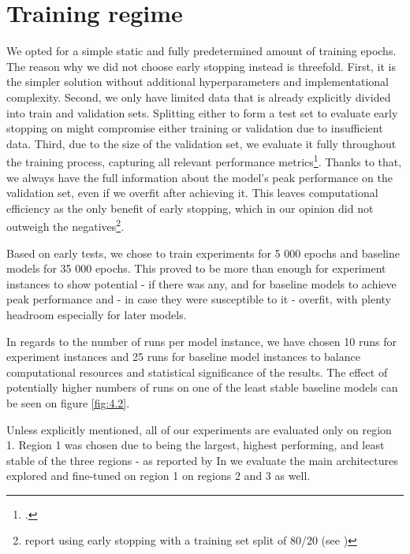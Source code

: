 \section{Training regime}\label{ch:4.4}

We opted for a simple static and fully predetermined amount of training epochs. The reason why we did not choose early stopping instead is threefold. First, it is the simpler solution without additional hyperparameters and implementational complexity. Second, we only have limited data that is already explicitly divided into train and validation sets. Splitting either to form a test set to evaluate early stopping on might compromise either training or validation due to insufficient data. Third, due to the size of the validation set, we evaluate it fully throughout the training process, capturing all relevant performance metrics\footnote{.}. Thanks to that, we always have the full information about the model’s peak performance on the validation set, even if we overfit after achieving it. This leaves computational efficiency as the only benefit of early stopping, which in our opinion did not outweigh the negatives\footnote{\cite{klindt} report using early stopping with a training set split of 80/20 (see )}.

Based on early tests, we chose to train experiments for 5 000 epochs and baseline models for 35 000 epochs. This proved to be more than enough for experiment instances to show potential - if there was any, and for baseline models to achieve peak performance and - in case they were susceptible to it - overfit, with plenty headroom especially for later models. 

In regards to the number of runs per model instance, we have chosen 10 runs for experiment instances and 25 runs for baseline model instances to balance computational resources and statistical significance of the results. The effect of potentially higher numbers of runs on one of the least stable baseline models can be seen on figure \ref{fig:4.2}.

Unless explicitly mentioned, all of our experiments are evaluated only on region 1. Region 1 was chosen due to being the largest, highest performing, and least stable of the three regions - as reported by \citeauthor{antolik} In  we evaluate the main architectures explored and fine-tuned on region 1 on regions 2 and 3 as well.

